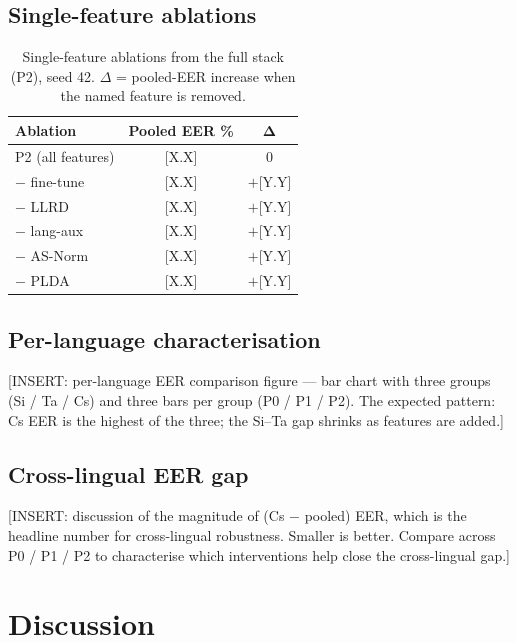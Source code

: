 \documentclass[11pt,a4paper]{article}
\begin{document}
\subsection{Single-feature ablations}
\label{sec:exp:ablation}

\begin{table}[t]
\centering
\caption{Single-feature ablations from the full stack (P2), seed 42.
$\Delta$ = pooled-EER increase when the named feature is removed.}
\label{tab:ablation}
\begin{tabular}{lcc}
\toprule
\textbf{Ablation} & \textbf{Pooled EER \%} & $\boldsymbol{\Delta}$ \\
\midrule
P2 (all features)   & [X.X] & 0 \\
$-$ fine-tune       & [X.X] & $+$[Y.Y] \\
$-$ LLRD            & [X.X] & $+$[Y.Y] \\
$-$ lang-aux        & [X.X] & $+$[Y.Y] \\
$-$ AS-Norm         & [X.X] & $+$[Y.Y] \\
$-$ PLDA            & [X.X] & $+$[Y.Y] \\
\bottomrule
\end{tabular}
\end{table}

\subsection{Per-language characterisation}
\label{sec:exp:perlang}

[INSERT: per-language EER comparison figure — bar chart with three
groups (Si / Ta / Cs) and three bars per group (P0 / P1 / P2). The
expected pattern: Cs EER is the highest of the three; the
Si--Ta gap shrinks as features are added.]

\subsection{Cross-lingual EER gap}
\label{sec:exp:crosslingual}

[INSERT: discussion of the magnitude of (Cs $-$ pooled) EER, which is
the headline number for cross-lingual robustness. Smaller is better.
Compare across P0 / P1 / P2 to characterise which interventions
help close the cross-lingual gap.]

\section{Discussion}
\label{sec:discussion}
\end{document}
